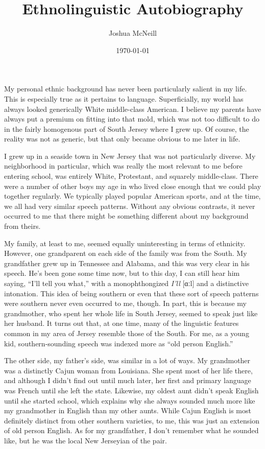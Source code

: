 \documentclass{article}
\author{Joshua McNeill}
\title{Ethnolinguistic Autobiography}
\date{\today}
\begin{document}
  \maketitle
  \doublespacing
  My personal ethnic background has never been particularly salient in my life.
  This is especially true as it pertains to language.
  Superficially, my world has always looked generically White middle-class American.
  I believe my parents have always put a premium on fitting into that mold, which was not too difficult to do in the fairly homogenous part of South Jersey where I grew up.
  Of course, the reality was not as generic, but that only became obvious to me later in life.

  I grew up in a seaside town in New Jersey that was not particularly diverse.
  My neighborhood in particular, which was really the most relevant to me before entering school, was entirely White, Protestant, and squarely middle-class.
  There were a number of other boys my age in who lived close enough that we could play together regularly.
  We typically played popular American sports, and at the time, we all had very similar speech patterns.
  Without any obvious contrasts, it never occurred to me that there might be something different about my background from theirs.

  My family, at least to me, seemed equally uninteresting in terms of ethnicity.
  However, one grandparent on each side of the family was from the South.
  My grandfather grew up in Tennessee and Alabama, and this was very clear in his speech.
  He's been gone some time now, but to this day, I can still hear him saying, ``I'll tell you what,'' with a monophthongized \emph{I'll} [ɑːl] and a distinctive intonation.
  This idea of being southern or even that these sort of speech patterns were southern never even occurred to me, though.
  In part, this is because my grandmother, who spent her whole life in South Jersey, seemed to speak just like her husband.
  It turns out that, at one time, many of the linguistic features common in my area of Jersey resemble those of the South.
  For me, as a young kid, southern-sounding speech was indexed more as ``old person English.''

  The other side, my father's side, was similar in a lot of ways.
  My grandmother was a distinctly Cajun woman from Louisiana.
  She spent most of her life there, and although I didn't find out until much later, her first and primary language was French until she left the state.
  Likewise, my oldest aunt didn't speak English until she started school, which explains why she always sounded much more like my grandmother in English than my other aunts.
  While Cajun English is most definitely distinct from other southern varieties, to me, this was just an extension of old person English.
  As for my grandfather, I don't remember what he sounded like, but he was the local New Jerseyian of the pair.
\end{document}
